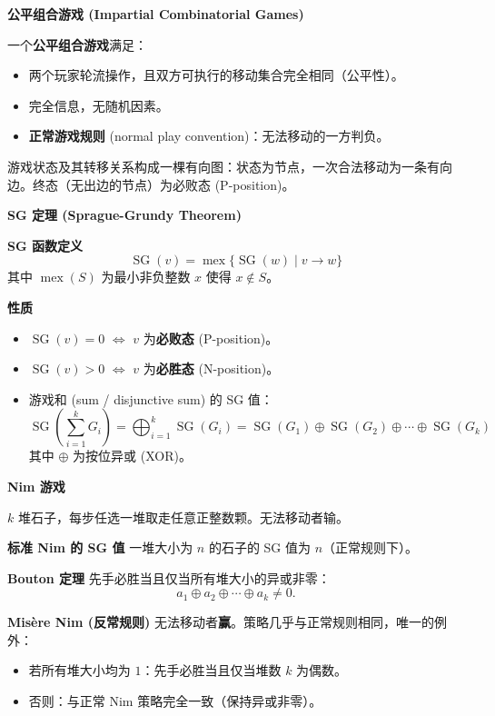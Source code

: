 \textbf{公平组合游戏 (Impartial Combinatorial Games)}

一个\textbf{公平组合游戏}满足：
\begin{itemize}
\item 两个玩家轮流操作，且双方可执行的移动集合完全相同（公平性）。
\item 完全信息，无随机因素。
\item \textbf{正常游戏规则} (normal play convention)：无法移动的一方判负。
\end{itemize}

游戏状态及其转移关系构成一棵有向图：状态为节点，一次合法移动为一条有向边。终态（无出边的节点）为必败态 (P-position)。

\textbf{SG 定理 (Sprague-Grundy Theorem)}

\textbf{SG 函数定义}
\[
\operatorname{SG}(v)=\operatorname{mex}\{\operatorname{SG}(w)\mid v\to w\}
\]
其中 $\operatorname{mex}(S)$ 为最小非负整数 $x$ 使得 $x\notin S$。

\textbf{性质}
\begin{itemize}
\item $\operatorname{SG}(v)=0$ $\iff$ $v$ 为\textbf{必败态} (P-position)。
\item $\operatorname{SG}(v)>0$ $\iff$ $v$ 为\textbf{必胜态} (N-position)。
\item 游戏和 (sum / disjunctive sum) 的 SG 值：
  \[
  \operatorname{SG}\left( \sum_{i=1}^{k} G_i \right) = \bigoplus_{i=1}^{k} \operatorname{SG}(G_i) = \operatorname{SG}(G_1) \oplus \operatorname{SG}(G_2) \oplus \cdots \oplus \operatorname{SG}(G_k)
  \]
  其中 $\oplus$ 为按位异或 (XOR)。
\end{itemize}

\textbf{Nim 游戏}

$k$ 堆石子，每步任选一堆取走任意正整数颗。无法移动者输。

\textbf{标准 Nim 的 SG 值}
一堆大小为 $n$ 的石子的 SG 值为 $n$（正常规则下）。

\textbf{Bouton 定理}
先手必胜当且仅当所有堆大小的异或非零：
\[
a_1\oplus a_2\oplus\cdots\oplus a_k\neq 0.
\]

\textbf{Misère Nim (反常规则)}
无法移动者\textbf{赢}。策略几乎与正常规则相同，唯一的例外：
\begin{itemize}
\item 若所有堆大小均为 $1$：先手必胜当且仅当堆数 $k$ 为偶数。
\item 否则：与正常 Nim 策略完全一致（保持异或非零）。
\end{itemize}

